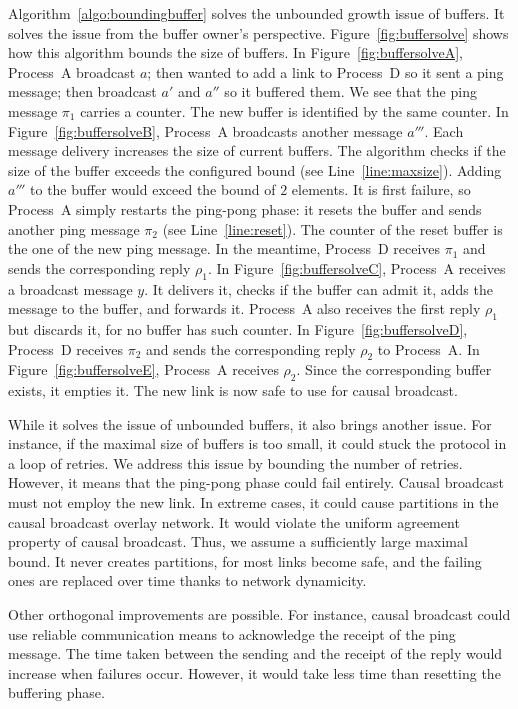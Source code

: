 Algorithm~\ref{algo:boundingbuffer} solves the unbounded growth issue of
buffers. It solves the issue from the buffer owner's
perspective. Figure~\ref{fig:buffersolve} shows how this algorithm bounds the
size of buffers. In Figure~\ref{fig:buffersolveA}, Process~A broadcast $a$; then
wanted to add a link to Process~D so it sent a ping message; then broadcast
$a'$ and $a''$ so it buffered them. We see that the ping message $\pi_1$
carries a counter. The new buffer is identified by the same counter. In
Figure~\ref{fig:buffersolveB}, Process~A broadcasts another message $a'''$. Each
message delivery increases the size of current buffers. The algorithm checks if
the size of the buffer exceeds the configured bound (see
Line~\ref{line:maxsize}). Adding $a'''$ to the buffer would exceed the bound of
$2$ elements. It is first failure, so Process~A simply restarts the
ping-pong phase: it resets the buffer and sends another ping message
$\pi_2$ (see Line~\ref{line:reset}). The counter of the reset buffer is the one
of the new ping message. In the meantime, Process~D receives $\pi_1$ and
sends the corresponding reply $\rho_1$. In
Figure~\ref{fig:buffersolveC}, Process~A receives a broadcast message $y$. It
delivers it, checks if the buffer can admit it, adds the message to the buffer,
and forwards it. Process~A also receives the first reply $\rho_1$ but
discards it, for no buffer has such counter. In Figure~\ref{fig:buffersolveD},
Process~D receives $\pi_2$ and sends the corresponding reply
$\rho_2$ to Process~A. In Figure~\ref{fig:buffersolveE}, Process~A receives
$\rho_2$. Since the corresponding buffer exists, it empties it. The new link
is now safe to use for causal broadcast.

While it solves the issue of unbounded buffers, it also brings another
issue. For instance, if the maximal size of buffers is too small, it could stuck
the protocol in a loop of retries. We address this issue by bounding the number
of retries. However, it means that the ping-pong phase could fail
entirely. Causal broadcast must not employ the new link. In extreme cases, it
could cause partitions in the causal broadcast overlay network. It would violate
the uniform agreement property of causal broadcast. Thus, we assume a
sufficiently large maximal bound. It never creates partitions, for most links
become safe, and the failing ones are replaced over time thanks to
network dynamicity.

Other orthogonal improvements are possible. For instance, causal broadcast could
use reliable communication means to acknowledge the receipt of the ping
message. The time taken between the sending and the receipt of the
reply would increase when failures occur. However, it would take less
time than resetting the buffering phase.

